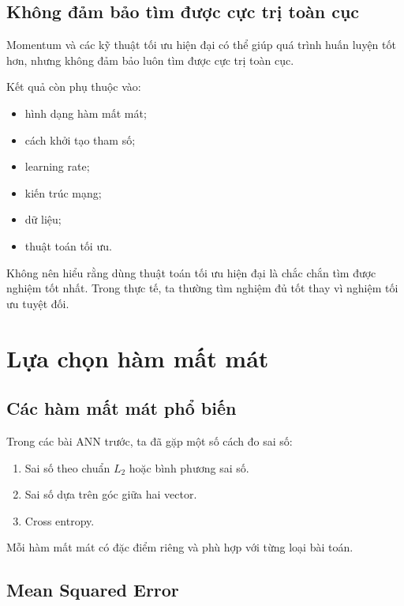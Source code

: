\documentclass[12pt,a4paper]{report}
\begin{document}
\section{Không đảm bảo tìm được cực trị toàn cục}

Momentum và các kỹ thuật tối ưu hiện đại có thể giúp quá trình huấn luyện tốt hơn, nhưng không đảm bảo luôn tìm được cực trị toàn cục.

Kết quả còn phụ thuộc vào:

\begin{itemize}
    \item hình dạng hàm mất mát;
    \item cách khởi tạo tham số;
    \item learning rate;
    \item kiến trúc mạng;
    \item dữ liệu;
    \item thuật toán tối ưu.
\end{itemize}

\begin{canhbao}
Không nên hiểu rằng dùng thuật toán tối ưu hiện đại là chắc chắn tìm được nghiệm tốt nhất. Trong thực tế, ta thường tìm nghiệm đủ tốt thay vì nghiệm tối ưu tuyệt đối.
\end{canhbao}

\chapter{Lựa chọn hàm mất mát}

\section{Các hàm mất mát phổ biến}

Trong các bài ANN trước, ta đã gặp một số cách đo sai số:

\begin{enumerate}
    \item Sai số theo chuẩn $L_2$ hoặc bình phương sai số.
    \item Sai số dựa trên góc giữa hai vector.
    \item Cross entropy.
\end{enumerate}

Mỗi hàm mất mát có đặc điểm riêng và phù hợp với từng loại bài toán.

\section{Mean Squared Error}
\end{document}
